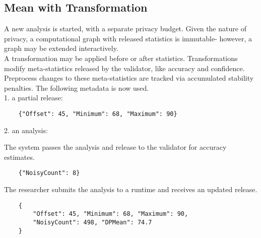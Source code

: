 \documentclass[11pt]{article}
\begin{document}
\subsection{Mean with Transformation}
A new analysis is started, with a separate privacy budget. Given the nature of privacy, a computational graph with released statistics is immutable- however, a graph may be extended interactively. \\
A transformation may be applied before or after statistics. Transformations modify meta-statistics released by the validator, like accuracy and confidence. Preprocess changes to these meta-statistics are tracked via accumulated stability penalties. The following metadata is now used. \\
1. a partial release:
\begin{verbatim}
    {"Offset": 45, "Minimum": 68, "Maximum": 90}
\end{verbatim}
2. an analysis:
\begin {center}
\end{center}
The system passes the analysis and release to the validator for accuracy estimates.
\begin{verbatim}
    {"NoisyCount": 8}
\end{verbatim}
The researcher submits the analysis to a runtime and receives an updated release.
\begin{verbatim}
    {
        "Offset": 45, "Minimum": 68, "Maximum": 90,
        "NoisyCount": 498, "DPMean": 74.7
    }
\end{verbatim} 
\end{document}
